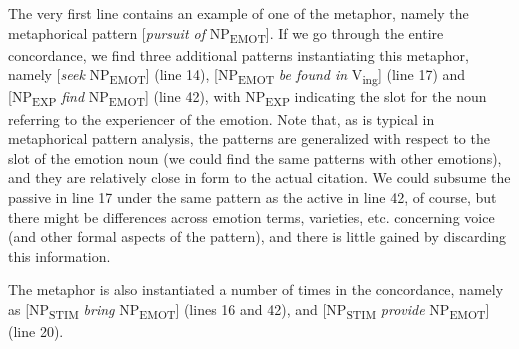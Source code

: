 The very first line contains an example of one of the  metaphor,  namely the metaphorical pattern [\textit{pursuit of} NP\textsubscript{EMOT}]. If we go through the entire concordance,  we find three additional patterns instantiating this metaphor, namely [\textit{seek} NP\textsubscript{EMOT}] (line 14), [NP\textsubscript{EMOT} \textit{be found in} V\textsubscript{ing}] (line 17) and [NP\textsubscript{EXP} \textit{find} NP\textsubscript{EMOT}] (line 42), with NP\textsubscript{EXP} indicating the slot for the noun  referring to the experiencer of the emotion.  Note that, as is typical in metaphorical  pattern analysis,  the patterns are generalized with respect to the slot of the emotion noun (we could find the same patterns with other emotions), and they are relatively close in form to the actual citation. We could subsume the passive  in line 17 under the same pattern as the active in line 42, of course, but there might be differences across emotion terms, varieties,  etc. concerning voice (and other formal aspects of the pattern), and there is little gained by discarding this information.

The  metaphor  is also instantiated a number of times in the concordance,  namely as [NP\textsubscript{STIM} \textit{bring} NP\textsubscript{EMOT}] (lines 16 and 42), and [NP\textsubscript{STIM} \textit{provide} NP\textsubscript{EMOT}] (line 20).


